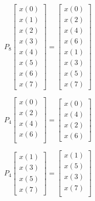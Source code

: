 \documentclass[journal,12pt,twocolumn]{IEEEtran}
\renewcommand\thesection{\arabic{section}}
\begin{document}
\begin{enumerate}[label=\arabic*.,ref=\thesection.\theenumi]
	\begin{equation}
		P_{8}
		\begin{bmatrix}
			x(0) \\ 
			x(1) \\ 
			x(2) \\ 
			x(3) \\ 
			x(4) \\ 
			x(5) \\
			x(6) \\
			x(7)
		\end{bmatrix}
		= 
		\begin{bmatrix}
			x(0) \\ 
			x(2) \\ 
			x(4) \\ 
			x(6) \\
			x(1) \\ 
			x(3) \\ 
			x(5) \\
			x(7)
		\end{bmatrix}
	\end{equation}
	
	\begin{equation}
		P_{4}
		\begin{bmatrix}
			x(0) \\ 
			x(2) \\ 
			x(4) \\ 
			x(6) \\
		\end{bmatrix}
		= 
		\begin{bmatrix}
			x(0) \\ 
			x(4) \\ 
			x(2) \\
			x(6)
		\end{bmatrix}
	\end{equation}
	
	\begin{equation}
		P_{4}
		\begin{bmatrix}
			x(1) \\ 
			x(3) \\ 
			x(5) \\
			x(7)
		\end{bmatrix}
		= 
		\begin{bmatrix}
			x(1) \\ 
			x(5) \\ 
			x(3) \\ 
			x(7) \\
		\end{bmatrix}
	\end{equation}
	

\end{enumerate}
\end{document}
